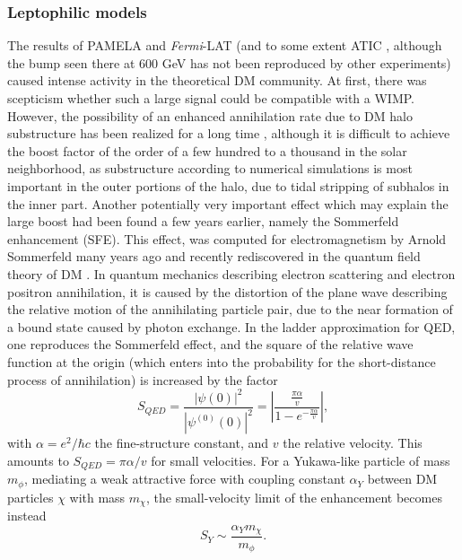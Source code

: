 \documentclass[10pt,aps,pra,reprint,amsmath,amsfonts,amssymb,showpacs,nofootinbib,floatfix]{revtex4-1}
\newcommand{\Fermi}{{\em Fermi}\xspace}
\begin{document}
\subsubsection{Leptophilic models}
\label{sect:LP}
The results of PAMELA \cite{Adriani:2008zr} and \Fermi-LAT
\cite{Abdo:2009zk} (and to some extent ATIC
\cite{2008Natur.456..362C}, although the bump seen there at 600 GeV
has not been reproduced by other experiments) caused intense
activity in the theoretical DM community. At first, there was
scepticism whether such a large signal could be compatible with a
WIMP. However, the possibility of an enhanced annihilation rate due to
DM halo substructure has been realized for a long time
\cite{1993ApJ...411..439S,Bergstrom:1998zs,Moore:1999nt}, although it
is difficult to achieve the boost factor of the order of a few hundred
to a thousand in the solar neighborhood, as substructure according to
numerical simulations is most important in the outer portions of the
halo, due to tidal stripping of subhalos in the inner part. Another
potentially very important effect which may explain the large boost
had been found a few years earlier, namely the Sommerfeld enhancement
(SFE). This effect, was computed for electromagnetism by Arnold
Sommerfeld many years ago \cite{sommerfeld} and recently rediscovered
in the quantum field theory of DM
\cite{2005PhRvD..71f3528H,2007NuPhB.787..152C,2009PhRvD..79a5014A}.
In quantum mechanics describing electron scattering and electron
positron annihilation, it is caused by the distortion of the plane
wave describing the relative motion of the annihilating particle pair,
due to the near formation of a bound state caused by photon
exchange. In the ladder approximation for QED, one reproduces the
Sommerfeld effect, and the square of the relative wave function at the
origin (which enters into the probability for the short-distance
process of annihilation) is increased by the factor
\cite{2009PhRvD..79a5014A}
\begin{equation}
S_{QED}=\frac{|\psi(0)|^2}{|\psi^{(0)}(0)|^2}=
\left|\frac{\frac{\pi\alpha}{v}}{1-e^{-\frac{\pi\alpha}{v}}}\right|,
\end{equation}
with $\alpha =e^2/\hbar c$ the fine-structure constant, and $v$ the relative
velocity. This amounts to $S_{QED}=\pi\alpha/v$ for small velocities. For a
Yukawa-like particle of mass $m_\phi$, mediating a weak attractive force with
coupling constant $\alpha_Y$ between DM particles $\chi$ with mass
$m_\chi$, the small-velocity limit of the enhancement becomes instead
\begin{equation}
S_Y\sim\frac{\alpha_Y m_\chi}{m_\phi}.
\label{eq:saturation}
\end{equation}
\end{document}
